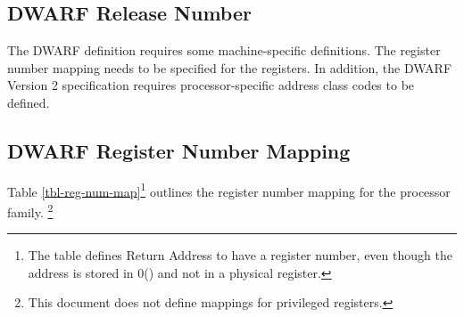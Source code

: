 \subsection{DWARF Release Number}

The DWARF definition requires some machine-specific definitions.
The register number mapping needs to be specified for the \xARCH
registers. In addition, the DWARF Version 2 specification
requires processor-specific address class codes to be defined.

\subsection{DWARF Register Number Mapping}

Table \ref{tbl-reg-num-map}\footnote{The table defines Return Address
  to have a register number, even though the address is stored in
  0(\RSP) and not in a physical register.}  outlines the register
number mapping for the \xARCH processor family.%
\footnote{This document does not define mappings for privileged registers.}%

